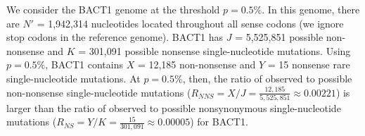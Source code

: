 We consider the BACT1 genome at the threshold $p = 0.5\%$.
%
In this genome, there are $N'$ = 1,942,314 nucleotides
located throughout all sense codons (we ignore stop codons in the reference genome).
%
BACT1 has $J$ = 5,525,851 possible non-nonsense and
$K$ = 301,091 possible nonsense single-nucleotide mutations.
%
Using $p = 0.5\%$, BACT1 contains
$X$ = 12,185 non-nonsense and
$Y$ = 15 nonsense rare single-nucleotide mutations.
%
At $p = 0.5\%$, then, the ratio of observed to possible non-nonsense single-nucleotide mutations
($R_{NNS} = X / J = \frac{12,185}{5,525,851}
\approx 0.00221$)
is larger than the ratio of observed to possible nonsynonymous single-nucleotide mutations
($R_{NS} = Y / K = \frac{15}{301,091}
\approx 0.00005$)
for BACT1.
\endinput